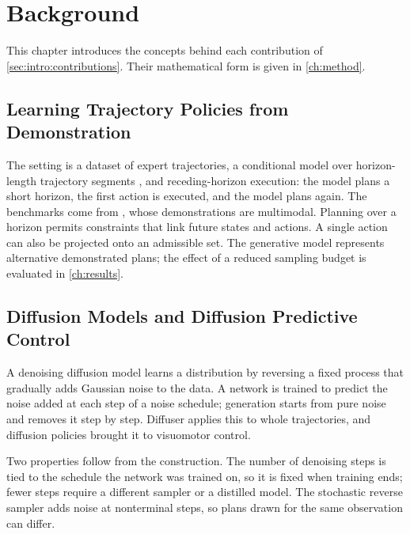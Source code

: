 \chapter{Background}\label{ch:background}

This chapter introduces the concepts behind each contribution of \autoref{sec:intro:contributions}.
Their mathematical form is given in \autoref{ch:method}.

\section{Learning Trajectory Policies from Demonstration}\label{sec:bg:il}

The setting is a dataset of expert trajectories, a conditional model over horizon-length
trajectory segments \parencite{janner2022planning,chi2023diffusion}, and receding-horizon
execution: the model plans a short horizon, the first action is executed, and the model plans again.
The benchmarks come from \parencite{jia2024towards}, whose demonstrations are multimodal. Planning
over a horizon permits constraints that link future states and actions. A single action can also be
projected onto an admissible set. The generative model represents alternative demonstrated plans;
the effect of a reduced sampling budget is evaluated in \autoref{ch:results}.

\section{Diffusion Models and Diffusion Predictive Control}\label{sec:bg:diffusion}

A denoising diffusion model \parencite{sohl2015deep,ho2020denoising} learns a distribution by
reversing a fixed process that gradually adds Gaussian noise to the data. A network is trained to
predict the noise added at each step of a noise schedule; generation starts from pure noise and
removes it step by step. Diffuser \parencite{janner2022planning} applies this to whole trajectories,
and diffusion policies \parencite{chi2023diffusion} brought it to visuomotor control.

Two properties follow from the construction. The number of denoising steps is tied to the schedule
the network was trained on, so it is fixed when training ends; fewer steps require a different sampler
\parencite{song2021denoising} or a distilled model. The stochastic reverse sampler adds noise at nonterminal steps, so plans drawn
for the same observation can differ.

